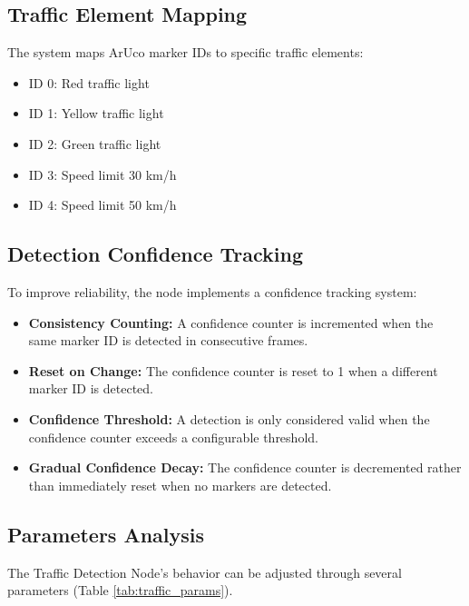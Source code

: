 \documentclass[9pt,technote]{IEEEtran}
\begin{document}
\subsection{Traffic Element Mapping}
The system maps ArUco marker IDs to specific traffic elements:

\begin{itemize}
    \item ID 0: Red traffic light
    \item ID 1: Yellow traffic light
    \item ID 2: Green traffic light
    \item ID 3: Speed limit 30 km/h
    \item ID 4: Speed limit 50 km/h
\end{itemize}

\subsection{Detection Confidence Tracking}
To improve reliability, the node implements a confidence tracking system:

\begin{itemize}
    \item \textbf{Consistency Counting:} A confidence counter is incremented when the same marker ID is detected in consecutive frames.
    
    \item \textbf{Reset on Change:} The confidence counter is reset to 1 when a different marker ID is detected.
    
    \item \textbf{Confidence Threshold:} A detection is only considered valid when the confidence counter exceeds a configurable threshold.
    
    \item \textbf{Gradual Confidence Decay:} The confidence counter is decremented rather than immediately reset when no markers are detected.
\end{itemize}

\subsection{Parameters Analysis}
The Traffic Detection Node's behavior can be adjusted through several parameters (Table \ref{tab:traffic_params}).
\end{document}
